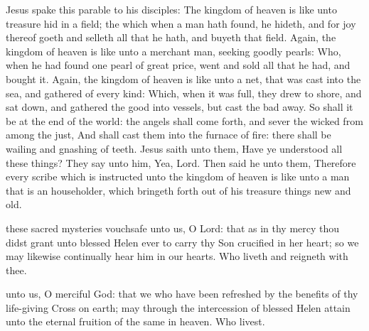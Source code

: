 
 Jesus spake this parable to his disciples: The kingdom of heaven is like unto treasure hid in a field; the which when a man hath found, he hideth, and for joy thereof goeth and selleth all that he hath, and buyeth that field. Again, the kingdom of heaven is like unto a merchant man, seeking goodly pearls: Who, when he had found one pearl of great price, went and sold all that he had, and bought it. Again, the kingdom of heaven is like unto a net, that was cast into the sea, and gathered of every kind: Which, when it was full, they drew to shore, and sat down, and gathered the good into vessels, but cast the bad away. So shall it be at the end of the world: the angels shall come forth, and sever the wicked from among the just, And shall cast them into the furnace of fire: there shall be wailing and gnashing of teeth. Jesus saith unto them, Have ye understood all these things? They say unto him, Yea, Lord. Then said he unto them, Therefore every scribe which is instructed unto the kingdom of heaven is like unto a man that is an householder, which bringeth forth out of his treasure things new and old.


\secret
{} these sacred mysteries vouchsafe unto us, O Lord: that as in thy mercy thou didst grant unto blessed Helen ever to carry thy Son crucified in her heart; so we may likewise continually hear him in our hearts. Who liveth and reigneth with thee.


\postcommunion
{} unto us, O merciful God: that we who have been refreshed by the benefits of thy life-giving Cross on earth; may through the intercession of blessed Helen attain unto the eternal fruition of the same in heaven. Who livest.


